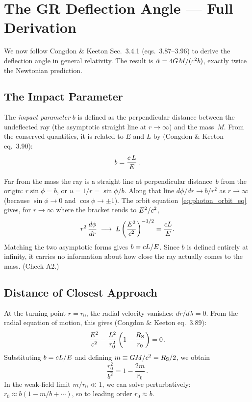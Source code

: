\section{The GR Deflection Angle --- Full Derivation}
\label{sec:gr_deflection}

We now follow Congdon \& Keeton Sec.~3.4.1 (eqs.~3.87--3.96) to derive
the deflection angle in general relativity.  The result is
$\hat{\alpha} = 4G M / (c^2 b)$, exactly twice
the Newtonian prediction.

\subsection{The Impact Parameter}
\label{sec:impact_parameter}

The \emph{impact parameter} $b$ is defined as the perpendicular distance
between the undeflected ray (the asymptotic straight line at $r \to \infty$)
and the mass~$M$.  From the conserved quantities, it is related to $E$ and
$L$ by (Congdon \& Keeton eq.~3.90):
\begin{equation}
    b = \frac{c\, L}{E} \,.
    \label{eq:impact_parameter}
\end{equation}


\begin{derivation}[Why $b = \speedoflight L/E$]
Far from the mass the ray is a straight line at perpendicular distance~$b$ from
the origin: $r\sin\phi = b$, or $u = 1/r = \sin\phi/b$.  Along that line
$d\phi/dr \to b/r^2$ as $r \to \infty$ (because $\sin\phi \to 0$ and
$\cos\phi \to \pm1$).  The orbit equation~\eqref{eq:photon_orbit_eq} gives,
for $r \to \infty$ where the bracket tends to $E^2/c^2$,
\[
    r^2\,\frac{d\phi}{dr} \;\longrightarrow\;
    L\left(\frac{E^2}{c^2}\right)^{-1/2} = \frac{c L}{E}.
\]
Matching the two asymptotic forms gives $b = \speedoflight L/E$.  Since $b$
is defined entirely at infinity, it carries no information about how close
the ray actually comes to the mass.  (Check A2.)
\end{derivation}
\subsection{Distance of Closest Approach}
\label{sec:closest_approach}

At the turning point $r = r_0$, the radial velocity vanishes:
$dr/d\lambda = 0$.  From the radial equation of motion, this gives
(Congdon \& Keeton eq.~3.89):
\begin{equation}
    \frac{E^2}{c^2} - \frac{L^2}{r_0^2}
    \left(1 - \frac{R_{\mathrm{S}}}{r_0}\right) = 0 \,.
    \label{eq:turning_point}
\end{equation}
Substituting $b = \speedoflight L / E$ and defining $m \equiv G M /
c^2 = R_{\mathrm{S}}/2$, we obtain
\begin{equation}
    \frac{r_0^2}{b^2} = 1 - \frac{2m}{r_0} \,.
    \label{eq:r0_implicit}
\end{equation}
In the weak-field limit $m/r_0 \ll 1$, we can solve perturbatively:
$r_0 \approx b\left(1 - m/b + \cdots\right)$, so to leading order
$r_0 \approx b$.


